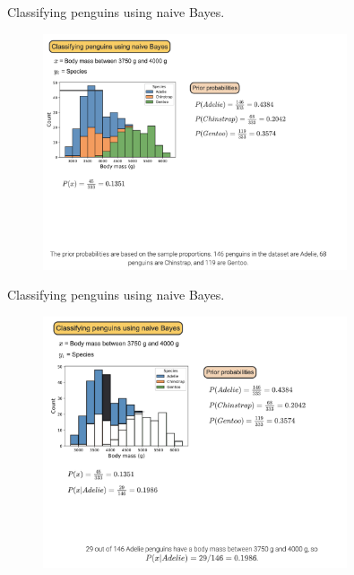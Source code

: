 \documentclass[10pt,dvipsnames]{beamer}
\begin{document}
\begin{frame}{Classifying penguins using naive Bayes.}
	\begin{figure}[ht]
		\centering
		\includegraphics[width=0.8\textwidth]{imgs/nb_10.png}
	\end{figure}
\end{frame}

\begin{frame}{Classifying penguins using naive Bayes.}
	\begin{figure}[ht]
		\centering
		\includegraphics[width=0.8\textwidth]{imgs/nb_11.png}
	\end{figure}
\end{frame}
\end{document}
